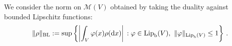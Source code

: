 \documentclass[11pt,reqno]{amsart}
\numberwithin{equation}{section}
\newcommand{\calM}{\mathcal{M}}
\newcommand{\Lip}{\mathrm{Lip}}
\newcommand{\dd}{\mathrm{d}}
\theoremstyle{definition}
\def\dd{\mathrm{d}}
\newcommand{\nbl}[1]{\|#1\|_{\mathrm{BL}} }
\newcommand{\RNEW}{\color{black}} %
\newcommand{\TODO}[1]{\todo[inline, color=cyan!20]{#1}}
\newcommand{\EEE}{\color{black}}
\numberwithin{equation}{section}
\begin{document}

We consider the  norm on $\calM(V)$ obtained by taking the duality against bounded Lipschitz functions:
\begin{equation}
\label{nbl-norm}
\nbl{\rho}: = \sup\left \{ \left| \int_V \varphi(x) \rho(\dd x ) \right| \, : \varphi \in \Lip_{\mathrm{b}}(V), \RNEW \ \|\varphi\|_{\Lip_{\mathrm{b}}(V)}\leq 1  \EEE  \right\}\,.
\end{equation}
\end{document}
